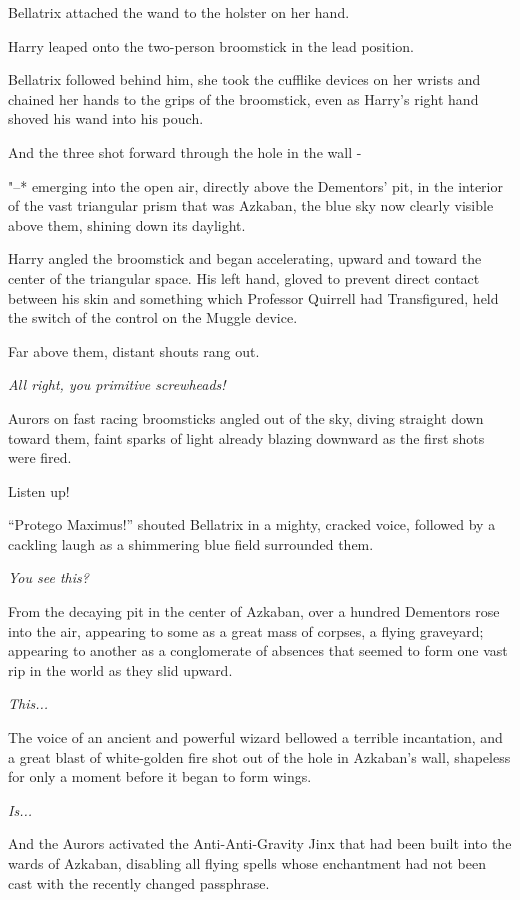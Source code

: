 Bellatrix attached the wand to the holster on her hand.

Harry leaped onto the two-person broomstick in the lead position.

Bellatrix followed behind him, she took the cufflike devices on her
wrists and chained her hands to the grips of the broomstick, even as
Harry's right hand shoved his wand into his pouch.

And the three shot forward through the hole in the wall -

"--* emerging into the open air, directly above the Dementors' pit, in the
interior of the vast triangular prism that was Azkaban, the blue sky now
clearly visible above them, shining down its daylight.

Harry angled the broomstick and began accelerating, upward and toward
the center of the triangular space. His left hand, gloved to prevent
direct contact between his skin and something which Professor Quirrell
had Transfigured, held the switch of the control on the Muggle device.

Far above them, distant shouts rang out.

\emph{All right, you primitive screwheads!}

Aurors on fast racing broomsticks angled out of the sky, diving straight
down toward them, faint sparks of light already blazing downward as the
first shots were fired.

Listen up!

``Protego Maximus!'' shouted Bellatrix in a mighty, cracked voice,
followed by a cackling laugh as a shimmering blue field surrounded them.

\emph{You see this?}

From the decaying pit in the center of Azkaban, over a hundred Dementors
rose into the air, appearing to some as a great mass of corpses, a
flying graveyard; appearing to another as a conglomerate of absences
that seemed to form one vast rip in the world as they slid upward.

\emph{This...}

The voice of an ancient and powerful wizard bellowed a terrible
incantation, and a great blast of white-golden fire shot out of the hole
in Azkaban's wall, shapeless for only a moment before it began to form
wings.

\emph{Is...}

And the Aurors activated the Anti-Anti-Gravity Jinx that had been built
into the wards of Azkaban, disabling all flying spells whose enchantment
had not been cast with the recently changed passphrase.

